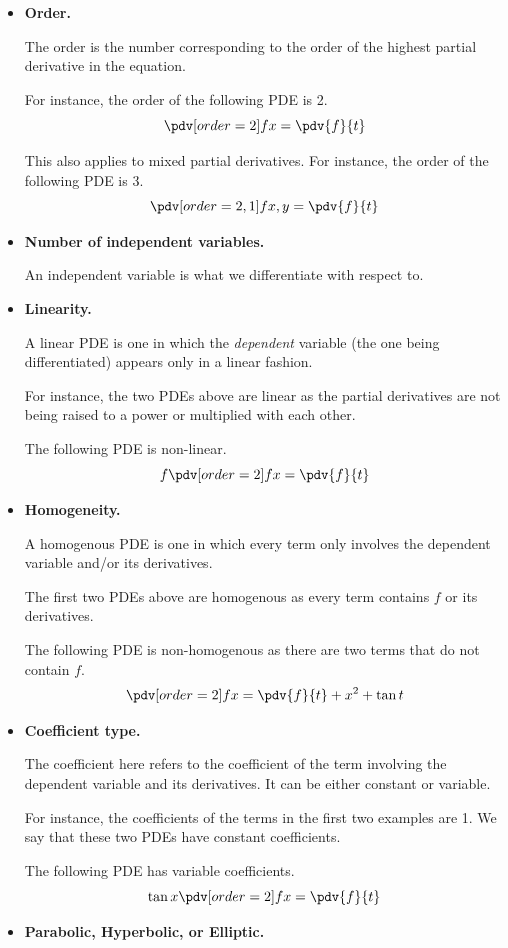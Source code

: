 \begin{itemize}
\item \textbf{Order.}

The order is the number corresponding to the order of the highest partial derivative in the equation. 

For instance, the order of the following PDE is 2. 
\[ \pdv[order={2}]{f}{x}=\pdv{f}{t} \]

This also applies to mixed partial derivatives. For instance, the order of the following PDE is 3.
\[ \pdv[order={2,1}]{f}{x,y}=\pdv{f}{t} \]

\item \textbf{Number of independent variables.}

An independent variable is what we differentiate with respect to. 

\item \textbf{Linearity.}

A linear PDE is one in which the \emph{dependent} variable (the one being differentiated) appears only in a linear fashion.

For instance, the two PDEs above are linear as the partial derivatives are not being raised to a power or multiplied with each other.

The following PDE is non-linear.
\[ f\pdv[order={2}]{f}{x}=\pdv{f}{t} \]

\item \textbf{Homogeneity.}

A homogenous PDE is one in which every term only involves the dependent variable and/or its derivatives.

The first two PDEs above are homogenous as every term contains $f$ or its derivatives.

The following PDE is non-homogenous as there are two terms that do not contain $f$.
\[ \pdv[order={2}]{f}{x}=\pdv{f}{t}+x^2+\tan t \]

\item \textbf{Coefficient type.}

The coefficient here refers to the coefficient of the term involving the dependent variable and its derivatives. It can be either constant or variable.

For instance, the coefficients of the terms in the first two examples are 1. We say that these two PDEs have constant coefficients.

The following PDE has variable coefficients.
\[ \tan x\pdv[order={2}]{f}{x}=\pdv{f}{t} \]

\item \textbf{Parabolic, Hyperbolic, or Elliptic.}


\end{itemize}
